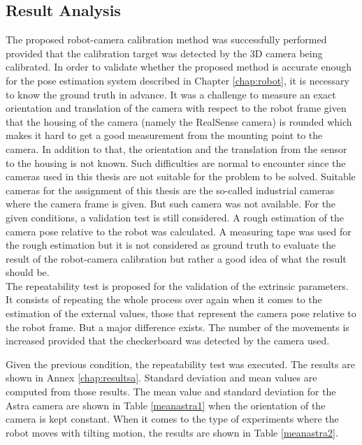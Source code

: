 \subsection{Result Analysis}

The proposed robot-camera calibration method was successfully performed provided that the calibration target was detected by the 3D camera being calibrated. In order to validate whether the proposed method is accurate enough for the pose estimation system described in Chapter \ref{chap:robot}, it is necessary to know the ground truth in advance. It was a challenge to measure an exact orientation and translation of the camera with respect to the robot frame given that the housing of the camera (namely the RealSense camera) is rounded which makes it hard to get a good measurement from the mounting point to the camera. In addition to that, the orientation and the translation from the sensor to the housing is not known. Such difficulties are normal to encounter since the cameras used in this thesis are not suitable for the problem to be solved. Suitable cameras for the assignment of this thesis are the so-called industrial cameras where the camera frame is given. But such camera was not available.  
For the given conditions, a validation test is still considered. A rough estimation of the camera pose relative to the robot was calculated. A measuring tape was used for the rough estimation but it is not considered as ground truth to evaluate the result of the robot-camera calibration but rather a good idea of what the result should be. \\
The repeatability test is proposed for the validation of the extrinsic parameters. It consists of repeating the whole process over again when it comes to the estimation of the external values, those that represent the camera pose relative to the robot frame. But a major difference exists. The number of the movements is increased provided that the checkerboard was detected by the camera used.

Given the previous condition, the repeatability test was executed. The results are shown in Annex \ref{chap:resultsa}. Standard deviation and mean values are computed from those results. The mean value and standard deviation for the Astra camera are shown in Table \ref{meanastra1} when the orientation of the camera is kept constant. When it comes to the type of experiments where the robot moves with tilting motion, the results are shown in Table \ref{meanastra2}.\\
